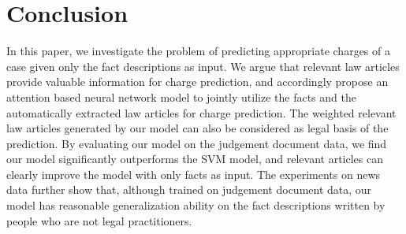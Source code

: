\section{Conclusion}
In this paper, we investigate the problem of predicting appropriate charges of a case given only the fact descriptions as input. We argue that relevant law articles provide valuable information for charge prediction, and accordingly propose an attention based neural network model to jointly utilize the facts and the automatically extracted law articles for charge prediction. The weighted relevant law articles generated by our model can also be considered as legal basis of the prediction. By evaluating our model on the judgement document data, we find our model significantly outperforms the SVM model, and relevant articles can clearly improve the model with only facts as input. The experiments on news data further show that, although trained on judgement document data, our model has reasonable generalization ability on the fact descriptions written by people who are not legal practitioners.